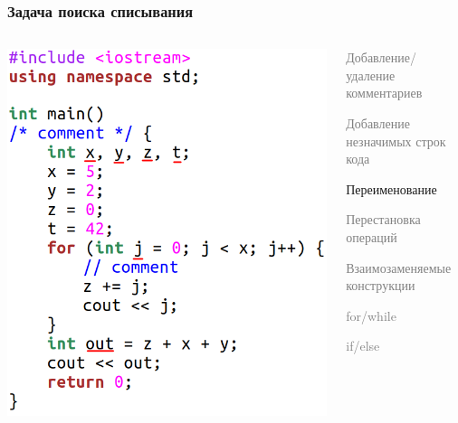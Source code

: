 \documentclass[10pt]{beamer}
\begin{document}
\begin{frame}[fragile]\frametitle{Задача поиска списывания}
	\begin{columns}[T]
		\centering
		\includegraphics[scale=0.7]{renamed.png}
		
		\centering
		\begin{itemize}
			\item \textcolor{gray}{Добавление/удаление комментариев
			\item Добавление незначимых строк кода}
				\item Переименование
				\textcolor{gray}{
				\item Перестановка операций
				\item Взаимозаменяемые конструкции
			}
			\begin{itemize}
				\item \textcolor{gray}{for/while
					\item if/else
				}
			\end{itemize}
		\end{itemize}
	\end{columns}
\end{frame}
\end{document}
